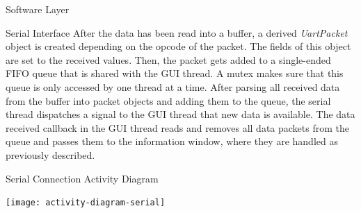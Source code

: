 \documentclass{matthijs}
\begin{document}
\begin{hoofdstuk}{Software Layer}
\begin{paragraaf}{Serial Interface}
			After the data has been read into a buffer, a derived \textit{UartPacket} object is created depending on the opcode of the packet.
			The fields of this object are set to the received values.
			Then, the packet gets added to a single-ended FIFO queue that is shared with the GUI thread.
			A mutex makes sure that this queue is only accessed by one thread at a time.
			After parsing all received data from the buffer into packet objects and adding them to the queue, the serial thread dispatches a signal to the GUI thread that new data is available.
			The data received callback in the GUI thread reads and removes all data packets from the queue and passes them to the information window, where they are handled as previously described.

			\clearpage

			\begin{figuur}{Serial Connection Activity Diagram}
				\vspace{-5ex}
				\singlespacing
				\centerline{
					\texttt{[image: activity-diagram-serial]}
				}
				\onehalfspacing
			\end{figuur}
		\end{paragraaf}

	\end{hoofdstuk}
\end{document}

